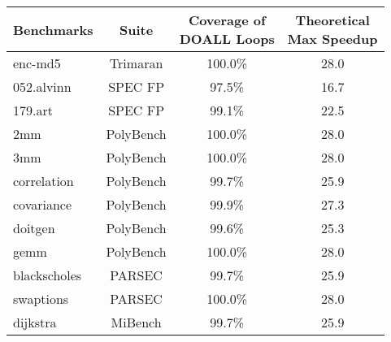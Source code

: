 \small
\centering
\begin{tabular}{|l|c|c|c|}
\hline
Benchmarks & Suite & \makecell{Coverage of \\DOALL Loops} & \makecell{Theoretical \\Max Speedup} \\ %
\hline
enc-md5    & Trimaran & 100.0\% & 28.0  \\ %
\hline
052.alvinn & SPEC FP  & 97.5\%  & 16.7 \\ %
\hline
179.art    & SPEC FP  & 99.1\%  & 22.5 \\ %
\hline
2mm        & PolyBench & 100.0\% & 28.0 \\ %
\hline
3mm        & PolyBench & 100.0\% & 28.0 \\ %
\hline
correlation & PolyBench & 99.7\% & 25.9 \\ %
\hline
covariance & PolyBench & 99.9\%  & 27.3 \\ %
\hline
doitgen   & PolyBench & 99.6\%  & 25.3  \\ %
\hline
gemm     & PolyBench  & 100.0\% & 28.0 \\ %
\hline
blackscholes & PARSEC & 99.7\% & 25.9 \\ %
\hline
swaptions & PARSEC & 100.0\% & 28.0 \\ %
\hline
dijkstra & MiBench  & 99.7\%  & 25.9 \\ %
\hline
\end{tabular}